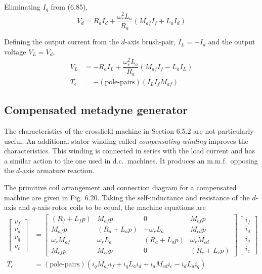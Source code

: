 \documentclass[a4paper,numbers=noenddot,12pt]{scrbook}
\begin{document}
Eliminating $I_q$ from (6.85),
\begin{equation}
    V_d = R_a I_d + \dfrac{\omega_r^2 L_a}{R_a}(M_{af} I_f + L_a I_d)
    \label{eq:Eq6.87}
\end{equation}

Defining the output current from the $d$-axis brush-pair, $I_L = -I_d$ and the output voltage $V_L = V_d$,
\begin{align}
    V_L & = -R_a I_L + \dfrac{\omega_r^2 L_a}{R_a}(M_{af} I_f - L_a I_L) \\
    T_e & = -(\text{pole-pairs})(I_L I_f M_{af})
    \label{eq:Eq6.89}
\end{align}

\subsection{Compensated metadyne generator} The characteristics of the crossfield machine in Section 6.5.2 are not particularly useful. An additional stator winding called \textit{compensating winding} improves the characteristics. This winding is connected in series with the load current and has a similar action to the one used in d.c.\ machines. It produces an m.m.f.\ opposing the $d$-axis armature reaction.

The primitive coil arrangement and connection diagram for a compensated machine are given in Fig. 6.20. Taking the self-inductance and resistance of the $d$-axis and $q$-axis rotor coils to be equal, the machine equations are
\begin{align}
    \begin{bmatrix}
        v_f \\ v_d \\ v_q \\ v_c
    \end{bmatrix}
    & = 
    \begin{bmatrix}
        (R_f + L_f p) & M_{af} p & 0 & M_{cf} p \\
        M_{af} p & (R_a + L_a p) & -\omega_r L_a & M_{cd} p \\
        \omega_r M_{af} & \omega_r L_a & (R_a + L_a p) & \omega_r M_{cd} \\
        M_{cf} p & M_{cd} p & 0 & (R_c + L_c p)
    \end{bmatrix}
    \begin{bmatrix}
        i_f \\ i_d \\ i_q \\ i_c
    \end{bmatrix} \\
    T_e & = (\text{pole-pairs})(i_q M_{af} i_f + i_q L_a i_d + i_a M_{cd} i_c - i_d L_a i_q)
    \label{eq:Eq6.91}
\end{align}
\end{document}
